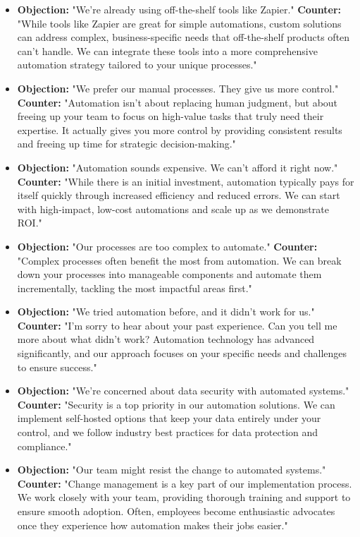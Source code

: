 \begin{itemize}
    \item \textbf{Objection:} "We're already using off-the-shelf tools like Zapier."
    \textbf{Counter:} "While tools like Zapier are great for simple automations, custom solutions can address complex, business-specific needs that off-the-shelf products often can't handle. We can integrate these tools into a more comprehensive automation strategy tailored to your unique processes."

    \item \textbf{Objection:} "We prefer our manual processes. They give us more control."
    \textbf{Counter:} "Automation isn't about replacing human judgment, but about freeing up your team to focus on high-value tasks that truly need their expertise. It actually gives you more control by providing consistent results and freeing up time for strategic decision-making."

    \item \textbf{Objection:} "Automation sounds expensive. We can't afford it right now."
    \textbf{Counter:} "While there is an initial investment, automation typically pays for itself quickly through increased efficiency and reduced errors. We can start with high-impact, low-cost automations and scale up as we demonstrate ROI."

    \item \textbf{Objection:} "Our processes are too complex to automate."
    \textbf{Counter:} "Complex processes often benefit the most from automation. We can break down your processes into manageable components and automate them incrementally, tackling the most impactful areas first."

    \item \textbf{Objection:} "We tried automation before, and it didn't work for us."
    \textbf{Counter:} "I'm sorry to hear about your past experience. Can you tell me more about what didn't work? Automation technology has advanced significantly, and our approach focuses on your specific needs and challenges to ensure success."

    \item \textbf{Objection:} "We're concerned about data security with automated systems."
    \textbf{Counter:} "Security is a top priority in our automation solutions. We can implement self-hosted options that keep your data entirely under your control, and we follow industry best practices for data protection and compliance."

    \item \textbf{Objection:} "Our team might resist the change to automated systems."
    \textbf{Counter:} "Change management is a key part of our implementation process. We work closely with your team, providing thorough training and support to ensure smooth adoption. Often, employees become enthusiastic advocates once they experience how automation makes their jobs easier."


\end{itemize}
